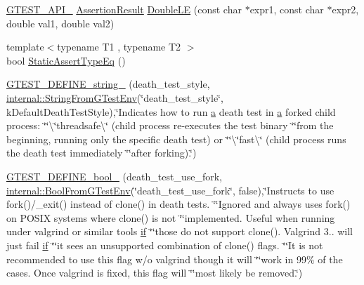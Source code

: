 \begin{DoxyCompactItemize}
\item 
\hyperlink{gtest-port_8h_aa73be6f0ba4a7456180a94904ce17790}{G\+T\+E\+S\+T\+\_\+\+A\+P\+I\+\_\+} \hyperlink{classtesting_1_1_assertion_result}{Assertion\+Result} \hyperlink{namespacetesting_ae10e2bb304b74abd1b06a2d912a8b43b}{Double\+LE} (const char $\ast$expr1, const char $\ast$expr2, double val1, double val2)
\item 
{\footnotesize template$<$typename T1 , typename T2 $>$ }\\bool \hyperlink{namespacetesting_a661e70fc6afeb5c085eed3716aa45059}{Static\+Assert\+Type\+Eq} ()
\item 
\hyperlink{namespacetesting_ad93c9ec89517d047ed323b79d96df251}{G\+T\+E\+S\+T\+\_\+\+D\+E\+F\+I\+N\+E\+\_\+string\+\_\+} (death\+\_\+test\+\_\+style, \hyperlink{namespacetesting_1_1internal_ac54dabc540bf79c2de91add679bfb93b}{internal\+::\+String\+From\+G\+Test\+Env}(\char`\"{}death\+\_\+test\+\_\+style\char`\"{}, k\+Default\+Death\+Test\+Style),\char`\"{}Indicates how to run \hyperlink{_07copy_08_2_read_camera_model_8m_a551a3d351eadcc0b9b1a2f24f0fb5ea0}{a} death test in \hyperlink{_07copy_08_2_read_camera_model_8m_a551a3d351eadcc0b9b1a2f24f0fb5ea0}{a} forked child process\+: \char`\"{}\char`\"{}\textbackslash{}\char`\"{}threadsafe\textbackslash{}\char`\"{} (child process re-\/executes the test binary \char`\"{}\char`\"{}from the beginning, running only the specific death test) or \char`\"{}\char`\"{}\textbackslash{}\char`\"{}fast\textbackslash{}\char`\"{} (child process runs the death test immediately \char`\"{}\char`\"{}after forking).\char`\"{})
\item 
\hyperlink{namespacetesting_afee59458b05682d57d3a389e0903bc01}{G\+T\+E\+S\+T\+\_\+\+D\+E\+F\+I\+N\+E\+\_\+bool\+\_\+} (death\+\_\+test\+\_\+use\+\_\+fork, \hyperlink{namespacetesting_1_1internal_a67132cdce23fb71b6c38ee34ef81eb4c}{internal\+::\+Bool\+From\+G\+Test\+Env}(\char`\"{}death\+\_\+test\+\_\+use\+\_\+fork\char`\"{}, false),\char`\"{}Instructs to use fork()/\+\_\+exit() instead of clone() in death tests. \char`\"{}\char`\"{}Ignored and always uses fork() on P\+O\+S\+IX systems where clone() is not \char`\"{}\char`\"{}implemented. Useful when running under valgrind or similar tools \hyperlink{jquery_8js_a42cbfadee2b4749e8f699ea8d745a0e4}{if} \char`\"{}\char`\"{}those do not support clone(). Valgrind 3.. will just fail \hyperlink{jquery_8js_a42cbfadee2b4749e8f699ea8d745a0e4}{if} \char`\"{}\char`\"{}it sees an unsupported combination of clone() flags. \char`\"{}\char`\"{}It is not recommended to use this flag w/o valgrind though it will \char`\"{}\char`\"{}work in 99\% of the cases. Once valgrind is fixed, this flag will \char`\"{}\char`\"{}most likely be removed.\char`\"{})

\end{DoxyCompactItemize}

